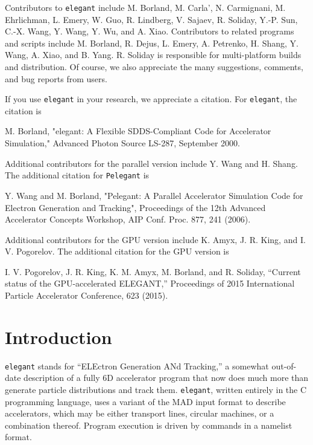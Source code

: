 \documentclass[11pt]{article}
\begin{document}
Contributors to {\tt elegant} include M. Borland, M. Carla', N. Carmignani, M. Ehrlichman, L. Emery, W. Guo, R. Lindberg,
V. Sajaev, R. Soliday, Y.-P. Sun, C.-X. Wang, Y. Wang, Y. Wu, and A. Xiao.
Contributors to related programs and scripts include M. Borland, R. Dejus, L. Emery, A. Petrenko, H. Shang, Y. Wang, 
A. Xiao, and B. Yang.
R. Soliday is responsible for multi-platform builds and distribution.
Of course, we also appreciate the many suggestions, comments, and bug reports from users.

If you use {\tt elegant} in your research, we appreciate a citation. For {\tt elegant}, the citation is
\begin{flushleft}
M. Borland, "elegant: A Flexible SDDS-Compliant Code for Accelerator Simulation," Advanced Photon Source LS-287, September 2000.
\end{flushleft}

Additional contributors for the parallel version include Y. Wang and H. Shang.
The additional citation for {\tt Pelegant} is
\begin{flushleft}
Y. Wang and M. Borland, "Pelegant: A Parallel Accelerator Simulation Code for Electron Generation and Tracking", Proceedings of the 12th Advanced Accelerator
Concepts Workshop, AIP Conf. Proc. 877, 241 (2006).
\end{flushleft}

Additional contributors for the GPU version include K. Amyx, J. R. King, and I. V. Pogorelov. 
The additional citation for the GPU version is
\begin{flushleft}
I. V. Pogorelov, J. R. King, K. M. Amyx, M. Borland, and R. Soliday, ``Current status of the GPU-accelerated ELEGANT,''
Proceedings of 2015 International Particle Accelerator Conference, 623 (2015).
\end{flushleft}

\section{Introduction}

{\tt elegant} stands for ``ELEctron Generation ANd Tracking,'' a
somewhat out-of-date description of a fully 6D accelerator program
that now does much more than generate particle distributions and track
them.  {\tt elegant}, written entirely in the C programming
language\cite{Kernighan}, uses a variant of the MAD\cite{MAD} input
format to describe accelerators, which may be either transport lines,
circular machines, or a combination thereof.  Program execution is
driven by commands in a namelist format.
\end{document}
